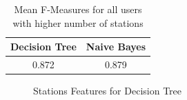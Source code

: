 \begin{table}[H]	
	\begin{center}
		\begin{tabular}{c | c}
			Decision Tree & Naive Bayes \\
			\hline
			0.872  & 0.879 \\
		\end{tabular}
	\end{center}
	\caption{Mean F-Measures for all users with higher number of stations}
	\label{table:f_measures_all_users_more_stations}
\end{table}

\begin{figure}[H]
	\caption{Stations Features for Decision Tree}
\end{figure}

